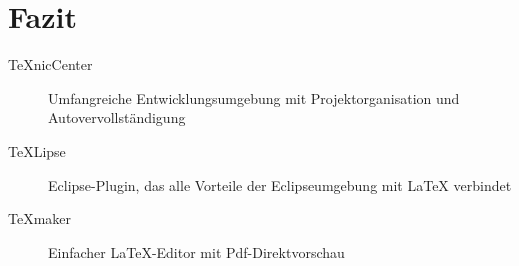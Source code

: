 \chapter{Fazit}

\begin{description}
	\item [TeXnicCenter] Umfangreiche Entwicklungsumgebung mit Projektorganisation und Autovervollständigung
	\item [TeXLipse] Eclipse-Plugin, das alle Vorteile der Eclipseumgebung mit LaTeX verbindet
	\item [TeXmaker] Einfacher LaTeX-Editor mit Pdf-Direktvorschau
\end{description}
